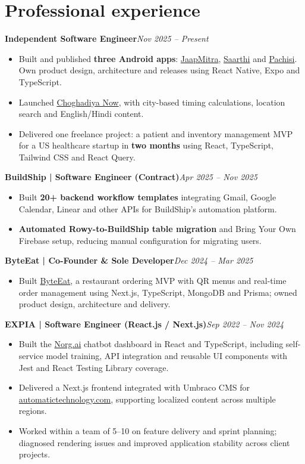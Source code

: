 \documentclass[a4paper,10pt]{article}
\newcommand{\job}[2]{\textbf{#1}\hfill\textit{#2}}
\begin{document}
\section{Professional experience}
\job{Independent Software Engineer}{Nov 2025 -- Present}
\begin{itemize}
\item Built and published \textbf{three Android apps}: \href{https://play.google.com/store/apps/details?id=com.g1mishra.jaapmitra}{JaapMitra}, \href{https://play.google.com/store/apps/details?id=com.g1mishra.saarthi}{Saarthi} and \href{https://play.google.com/store/apps/details?id=com.g1mishra.pachisi}{Pachisi}. Own product design, architecture and releases using React Native, Expo and TypeScript.
\item Launched \href{https://choghadiyanow.com/}{Choghadiya Now}, with city-based timing calculations, location search and English/Hindi content.
\item Delivered one freelance project: a patient and inventory management MVP for a US healthcare startup in \textbf{two months} using React, TypeScript, Tailwind CSS and React Query.
\end{itemize}
\job{BuildShip | Software Engineer (Contract)}{Apr 2025 -- Nov 2025}
\begin{itemize}
\item Built \textbf{20+ backend workflow templates} integrating Gmail, Google Calendar, Linear and other APIs for BuildShip's automation platform.
\item \textbf{Automated Rowy-to-BuildShip table migration} and Bring Your Own Firebase setup, reducing manual configuration for migrating users.
\end{itemize}
\job{ByteEat | Co-Founder \& Sole Developer}{Dec 2024 -- Mar 2025}
\begin{itemize}
\item Built \href{https://byteeat.vercel.app}{ByteEat}, a restaurant ordering MVP with QR menus and real-time order management using Next.js, TypeScript, MongoDB and Prisma; owned product design, architecture and delivery.
\end{itemize}
\job{EXPIA | Software Engineer (React.js / Next.js)}{Sep 2022 -- Nov 2024}
\begin{itemize}
\item Built the \href{https://norg.ai}{Norg.ai} chatbot dashboard in React and TypeScript, including self-service model training, API integration and reusable UI components with Jest and React Testing Library coverage.
\item Delivered a Next.js frontend integrated with Umbraco CMS for \href{https://www.automatictechnology.com}{automatictechnology.com}, supporting localized content across multiple regions.
\item Worked within a team of 5--10 on feature delivery and sprint planning; diagnosed rendering issues and improved application stability across client projects.
\end{itemize}
\end{document}
